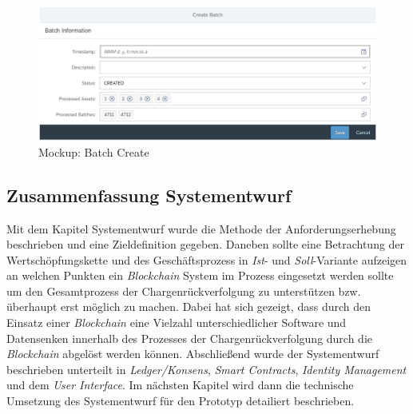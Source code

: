 \begin{figure}[H]
	\centering
	\includegraphics[width=1\linewidth]{pictures/ui-create-batch}
	\caption[Mockup: Batch Create]{Mockup: Batch Create}
	\label{fig:ui-create-batch}
\end{figure}




\subsection{Zusammenfassung Systementwurf}

Mit dem Kapitel Systementwurf wurde die Methode der Anforderungserhebung beschrieben und eine Zieldefinition gegeben. Daneben sollte eine Betrachtung der Wertschöpfungskette und des Geschäftsprozess in \textit{Ist}- und \textit{Soll}-Variante aufzeigen an welchen Punkten ein \textit{Blockchain} System im Prozess eingesetzt werden sollte um den Gesamtprozess der Chargenrückverfolgung zu unterstützen bzw. überhaupt erst möglich zu machen. Dabei hat sich gezeigt, dass durch den Einsatz einer \textit{Blockchain} eine Vielzahl unterschiedlicher Software und Datensenken innerhalb des Prozesses der Chargenrückverfolgung durch die \textit{Blockchain} abgelöst werden können. Abschließend wurde der Systementwurf beschrieben unterteilt in \textit{Ledger/Konsens}, \textit{Smart Contracts}, \textit{Identity Management} und dem \textit{User Interface}. Im nächsten Kapitel wird dann die technische Umsetzung des Systementwurf für den Prototyp detailiert beschrieben.

\newpage
